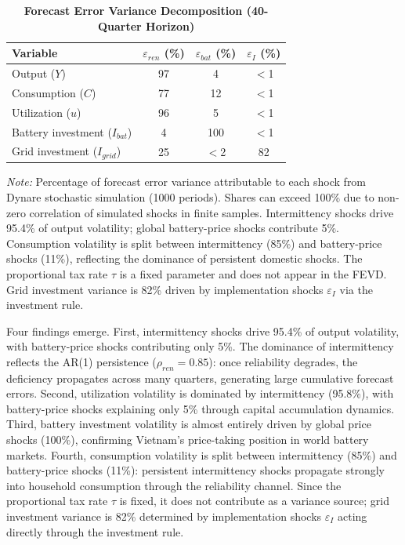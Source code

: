 \documentclass[12pt, a4paper]{article}
\begin{document}
	\begin{table}[H]
		\centering
		\caption{\textbf{Forecast Error Variance Decomposition (40-Quarter Horizon)}}
		\label{tab:fevd}
		\renewcommand{\arraystretch}{1.3}
		\small
		\begin{tabular}{l c c c}
			\toprule
			\textbf{Variable} & $\varepsilon_{ren}$ (\%) & $\varepsilon_{bat}$ (\%) & $\varepsilon_I$ (\%) \\
			\midrule
			Output ($Y$) & 97 & 4 & $<$1 \\
			Consumption ($C$) & 77 & 12 & $<$1 \\
			Utilization ($u$) & 96 & 5 & $<$1 \\
			Battery investment ($I_{bat}$) & 4 & 100 & $<$1 \\
			Grid investment ($I_{grid}$) & 25 & $<$2 & 82 \\
			\bottomrule
		\end{tabular}
		\vspace{0.2cm}
		\parbox{\textwidth}{\footnotesize \textit{Note:} Percentage of forecast error variance attributable to each shock from Dynare stochastic simulation (1000 periods). Shares can exceed 100\% due to non-zero correlation of simulated shocks in finite samples. Intermittency shocks drive 95.4\% of output volatility; global battery-price shocks contribute 5\%. Consumption volatility is split between intermittency (85\%) and battery-price shocks (11\%), reflecting the dominance of persistent domestic shocks. The proportional tax rate $\tau$ is a fixed parameter and does not appear in the FEVD. Grid investment variance is 82\% driven by implementation shocks $\varepsilon_I$ via the investment rule.}
	\end{table}
	
	Four findings emerge. First, intermittency shocks drive 95.4\% of output volatility, with battery-price shocks contributing only 5\%. The dominance of intermittency reflects the AR(1) persistence ($\rho_{ren}=0.85$): once reliability degrades, the deficiency propagates across many quarters, generating large cumulative forecast errors. Second, utilization volatility is dominated by intermittency (95.8\%), with battery-price shocks explaining only 5\% through capital accumulation dynamics. Third, battery investment volatility is almost entirely driven by global price shocks (100\%), confirming Vietnam's price-taking position in world battery markets. Fourth, consumption volatility is split between intermittency (85\%) and battery-price shocks (11\%): persistent intermittency shocks propagate strongly into household consumption through the reliability channel. Since the proportional tax rate $\tau$ is fixed, it does not contribute as a variance source; grid investment variance is 82\% determined by implementation shocks $\varepsilon_I$ acting directly through the investment rule.
	
\end{document}
